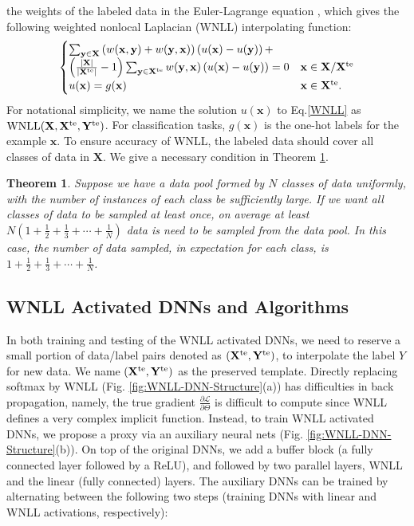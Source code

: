 \documentclass{article}
\newtheorem{thm}{Theorem}
\begin{document}
the weights of the labeled data in the Euler-Lagrange equation \cite{WNLL:2017}, which gives the following weighted nonlocal Laplacian (WNLL) interpolating function:
\begin{equation}
\label{WNLL}
\begin{cases}
\sum_{\mathbf{y}\in \mathbf{X}} \left(w(\mathbf{x}, \mathbf{y})+w(\mathbf{y}, \mathbf{x})\right)\left(u(\mathbf{x})-u(\mathbf{y})\right)+\\
\left(\frac{|\mathbf{X}|}{|\mathbf{X}^{\rm te}|}-1\right)\sum_{\mathbf{y}\in \mathbf{X}^{\rm te}}w(\mathbf{y}, \mathbf{x})\left(u(\mathbf{x})-u(\mathbf{y})\right)=0 & \mathbf{x}\in \mathbf{X}/\mathbf{X}^{\rm te}\\
u(\mathbf{x})=g(\mathbf{x}) &\mathbf{x}\in \mathbf{X}^{\rm te}.
\end{cases}
\end{equation}
For notational simplicity, we name the solution $u(\mathbf{x})$ to Eq.\ref{WNLL} as ${\rm WNLL}(\mathbf{X}, \mathbf{X}^{\rm te}, \mathbf{Y}^{\rm te})$.
For classification tasks, $g(\mathbf{x})$ is the one-hot labels for the example $\mathbf{x}$. To ensure accuracy of WNLL, the labeled data should cover all classes of data in $\mathbf{X}$. We give a necessary condition in Theorem \ref{Rep-Thm}.
\begin{thm}\label{Rep-Thm}
Suppose we have a data pool formed by $N$ classes of data uniformly, with the number of instances of each class be sufficiently large. If we want all classes of data to be sampled at least once, on average at least $N\left(1+\frac{1}{2}+\frac{1}{3}+\cdots +\frac{1}{N}\right)$ data is need to be sampled from the data pool. In this case, the number of data sampled, in expectation for each class, is $1+\frac{1}{2}+\frac{1}{3}+\cdots +\frac{1}{N}$.
\end{thm}

\subsection{WNLL Activated DNNs and Algorithms} \label{sec:Train-Test}
In both training and testing of the WNLL activated DNNs, we need to reserve a small portion of data/label pairs denoted as $(\mathbf{X}^{\rm te}, \mathbf{Y}^{\rm te})$, to interpolate the label $Y$ for new data. We name $(\mathbf{X}^{\rm te}, \mathbf{Y}^{\rm te})$ as the preserved template. Directly replacing softmax by WNLL (Fig. \ref{fig:WNLL-DNN-Structure}(a)) has difficulties in back propagation, namely, the true gradient $\frac{\partial \mathcal{L}}{\partial \Theta}$ is difficult to compute since WNLL defines a very complex implicit function. Instead, to train WNLL activated DNNs, we propose a proxy via an auxiliary neural nets (Fig. \ref{fig:WNLL-DNN-Structure}(b)). On top of the original DNNs, we add a buffer block (a fully connected layer followed by a ReLU), and followed by two parallel layers, WNLL and the linear (fully connected) layers. The auxiliary DNNs can be trained by alternating between the following two steps (training DNNs with linear and WNLL activations, respectively):
\end{document}
